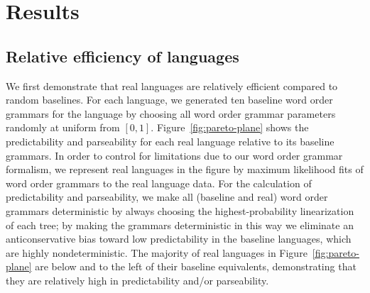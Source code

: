 \documentclass[9pt,twocolumn,twoside,lineno]{pnas-new}
\begin{document}
\section{Results}

\subsection{Relative efficiency of languages}
\label{sec:relative-efficiency}

We first demonstrate that real languages are relatively efficient compared to random baselines. For each language, we generated ten baseline word order grammars for the language by choosing all word order grammar parameters randomly at uniform from $[0,1]$. Figure~\ref{fig:pareto-plane} shows the predictability and parseability for each real language relative to its baseline grammars. In order to control for limitations due to our word order grammar formalism, we represent real languages in the figure by maximum likelihood fits of word order grammars to the real language data.
For the calculation of predictability and parseability, we make all (baseline and real) word order grammars deterministic by always choosing the highest-probability linearization of each tree; by making the grammars deterministic in this way we eliminate an anticonservative bias toward low predictability in the baseline languages, which are highly nondeterministic. 
The majority of real languages in Figure~\ref{fig:pareto-plane} are below and to the left of their baseline equivalents, demonstrating that they are relatively high in predictability and/or parseability.
\end{document}
